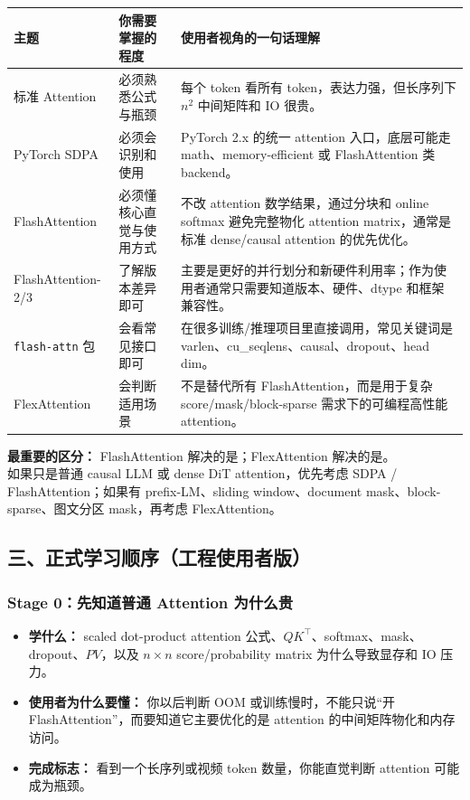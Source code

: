 \begin{center}
{\small
\begin{tabular}{p{3.2cm}p{4.4cm}p{5.3cm}}
\hline
\textbf{主题} & \textbf{你需要掌握的程度} & \textbf{使用者视角的一句话理解} \\
\hline
标准 Attention & 必须熟悉公式与瓶颈 & 每个 token 看所有 token，表达力强，但长序列下 $n^2$ 中间矩阵和 IO 很贵。 \\
PyTorch SDPA & 必须会识别和使用 & PyTorch 2.x 的统一 attention 入口，底层可能走 math、memory-efficient 或 FlashAttention 类 backend。 \\
FlashAttention & 必须懂核心直觉与使用方式 & 不改 attention 数学结果，通过分块和 online softmax 避免完整物化 attention matrix，通常是标准 dense/causal attention 的优先优化。 \\
FlashAttention-2/3 & 了解版本差异即可 & 主要是更好的并行划分和新硬件利用率；作为使用者通常只需要知道版本、硬件、dtype 和框架兼容性。 \\
\texttt{flash-attn} 包 & 会看常见接口即可 & 在很多训练/推理项目里直接调用，常见关键词是 varlen、cu\_seqlens、causal、dropout、head dim。 \\
FlexAttention & 会判断适用场景 & 不是替代所有 FlashAttention，而是用于复杂 score/mask/block-sparse 需求下的可编程高性能 attention。 \\
\hline
\end{tabular}
}
\end{center}

\begin{intubox}
\textbf{最重要的区分：} FlashAttention 解决的是；FlexAttention 解决的是。\\
如果只是普通 causal LLM 或 dense DiT attention，优先考虑 SDPA / FlashAttention；如果有 prefix-LM、sliding window、document mask、block-sparse、图文分区 mask，再考虑 FlexAttention。
\end{intubox}

\subsection{三、正式学习顺序（工程使用者版）}

\subsubsection*{Stage 0：先知道普通 Attention 为什么贵}

\begin{itemize}[leftmargin=1.5em]
  \item \textbf{学什么：} scaled dot-product attention 公式、$QK^\top$、softmax、mask、dropout、$PV$，以及 $n \times n$ score/probability matrix 为什么导致显存和 IO 压力。
  \item \textbf{使用者为什么要懂：} 你以后判断 OOM 或训练慢时，不能只说“开 FlashAttention”，而要知道它主要优化的是 attention 的中间矩阵物化和内存访问。
  \item \textbf{完成标志：} 看到一个长序列或视频 token 数量，你能直觉判断 attention 可能成为瓶颈。
\end{itemize}


